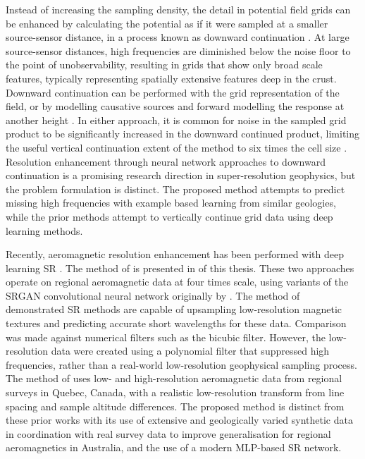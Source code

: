 Instead of increasing the sampling density, the detail in potential field grids can be enhanced by calculating the potential as if it were sampled at a smaller source-sensor distance, in a process known as downward continuation \parencite{bullardDeterminationMassesNecessary1948}.
At large source-sensor distances, high frequencies are diminished below the noise floor to the point of unobservability, resulting in grids that show only broad scale features, typically representing spatially extensive features deep in the crust.
Downward continuation can be performed with the grid representation of the field, or by modelling causative sources and forward modelling the response at another height \parencite{pilkingtonPotentialFieldContinuation2017}.
In either approach, it is common for noise in the sampled grid product to be significantly increased in the downward continued product, limiting the useful vertical continuation extent of the method to six times the cell size \parencite{dampneyEquivalentSourceTechnique1969,zuoDownwardContinuationTransformation2020}.
Resolution enhancement through neural network approaches to downward continuation \parencite{liStableDownwardContinuation2023,yeHighprecisionDownwardContinuation2022} is a promising research direction in super-resolution geophysics, but the problem formulation is distinct.
The proposed method attempts to predict missing high frequencies with example based learning from similar geologies, while the prior methods attempt to vertically continue grid data using deep learning methods.

Recently, aeromagnetic resolution enhancement has been performed with deep learning SR \parencite{bavandsavadkoohiHighresolutionAeromagneticMap2023,smithMagneticGridResolution2022}.
The method of \textcite{smithMagneticGridResolution2022} is presented in  of this thesis.
These two approaches operate on regional aeromagnetic data at four times scale, using variants of the SRGAN convolutional neural network originally by \textcite{ledigPhotorealisticSingleImage2017}.
The method of \textcite{smithMagneticGridResolution2022} demonstrated SR methods are capable of upsampling low-resolution magnetic textures and predicting accurate short wavelengths for these data.
Comparison was made against numerical filters such as the bicubic filter.
However, the low-resolution data were created using a polynomial filter that suppressed high frequencies, rather than a real-world low-resolution geophysical sampling process.
The method of \textcite{bavandsavadkoohiHighresolutionAeromagneticMap2023} uses low- and high-resolution aeromagnetic data from regional surveys in Quebec, Canada, with a realistic low-resolution transform from line spacing and sample altitude differences.
The proposed method is distinct from these prior works with its use of extensive and geologically varied synthetic data in coordination with real survey data to improve generalisation for regional aeromagnetics in Australia, and the use of a modern MLP-based SR network.

